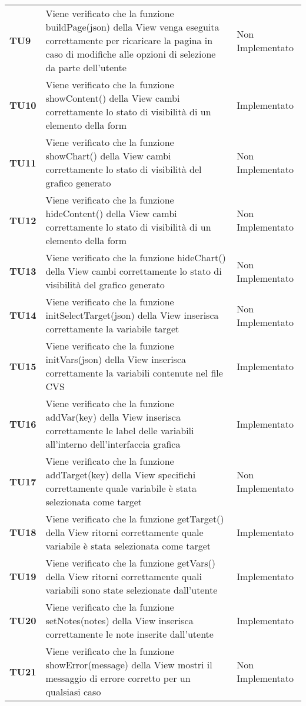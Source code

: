 \documentclass[../piano-di-qualifica.tex]{subfiles}
\begin{document}
\begin{longtable}[H]{>{\centering\bfseries}m{2.5cm} >{\centering}m{7.5cm} >{\centering\arraybackslash}m{3.5cm}}
  \textbf{TU9} & Viene verificato che la funzione buildPage(json) della View venga eseguita correttamente per ricaricare la pagina in caso di modifiche alle opzioni di selezione da parte dell'utente & Non Implementato \\
  \textbf{TU10} & Viene verificato che la funzione showContent() della View cambi correttamente lo stato di visibilità di un elemento della form & Implementato \\
  \textbf{TU11} & Viene verificato che la funzione showChart() della View cambi correttamente lo stato di visibilità del grafico generato & Non Implementato \\
  \textbf{TU12} & Viene verificato che la funzione hideContent() della View cambi correttamente lo stato di visibilità di un elemento della form & Non Implementato \\
  \textbf{TU13} & Viene verificato che la funzione hideChart() della View cambi correttamente lo stato di visibilità del grafico generato & Non Implementato \\
  \textbf{TU14} & Viene verificato che la funzione initSelectTarget(json) della View inserisca correttamente la variabile target & Non Implementato \\
  \textbf{TU15} & Viene verificato che la funzione initVars(json) della View inserisca correttamente la variabili contenute nel file CVS & Implementato \\
  \textbf{TU16} & Viene verificato che la funzione addVar(key) della View inserisca correttamente le label delle variabili all'interno dell'interfaccia grafica & Implementato \\
  \textbf{TU17} & Viene verificato che la funzione addTarget(key) della View specifichi correttamente quale variabile è stata selezionata come target & Non Implementato \\
  \textbf{TU18} & Viene verificato che la funzione getTarget() della View ritorni correttamente quale variabile è stata selezionata come target & Implementato \\
  \textbf{TU19} & Viene verificato che la funzione getVars() della View ritorni correttamente quali variabili sono state selezionate dall'utente & Implementato \\
  \textbf{TU20} & Viene verificato che la funzione setNotes(notes) della View inserisca correttamente le note inserite dall'utente & Implementato \\
  \textbf{TU21} & Viene verificato che la funzione showError(message) della View mostri il messaggio di errore corretto per un qualsiasi caso & Non Implementato \\

\end{longtable}
\end{document}
